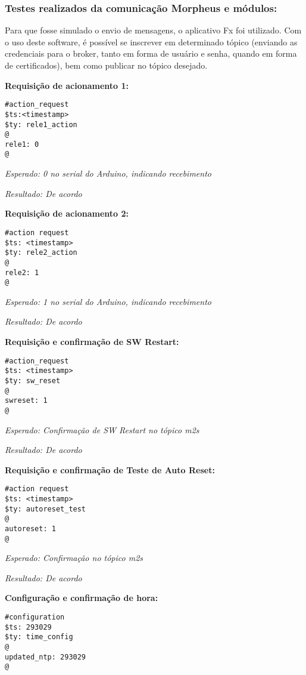 \subsubsection{Testes realizados da comunicação Morpheus e módulos:}

Para que fosse simulado o envio de mensagens, o aplicativo \wmqtt{} Fx foi utilizado. Com o uso deste software, é possível se inscrever em determinado tópico (enviando as credenciais para o broker, tanto em forma de usuário e senha, quando em forma de certificados), bem como publicar no tópico desejado.

\textbf{Requisição de acionamento 1:}
\begin{lstlisting}
#action_request
$ts:<timestamp>
$ty: rele1_action
@
rele1: 0
@
\end{lstlisting}

\textit{Esperado: 0 no serial do Arduino, indicando recebimento}

\textit{Resultado: De acordo}

\textbf{Requisição de acionamento 2:}
\begin{lstlisting}
#action request
$ts: <timestamp>
$ty: rele2_action
@
rele2: 1
@
\end{lstlisting}

\textit{Esperado: 1 no serial do Arduino, indicando recebimento}

\textit{Resultado: De acordo}

\textbf{Requisição e confirmação de SW Restart:}
\begin{lstlisting}
#action_request
$ts: <timestamp>
$ty: sw_reset
@
swreset: 1
@
\end{lstlisting}

\textit{Esperado: Confirmação de SW Restart no tópico \wmqtt{} m2s}

\textit{Resultado: De acordo}

\textbf{Requisição e confirmação de Teste de Auto Reset:}
\begin{lstlisting}
#action request
$ts: <timestamp>
$ty: autoreset_test
@
autoreset: 1
@
\end{lstlisting}

\textit{Esperado: Confirmação no tópico \wmqtt{} m2s}

\textit{Resultado: De acordo}

\textbf{Configuração e confirmação de hora:}
\begin{lstlisting}
#configuration
$ts: 293029
$ty: time_config
@
updated_ntp: 293029
@
\end{lstlisting}

